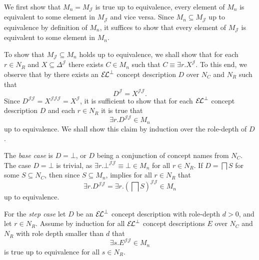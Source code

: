 \begin{Proof}
  We first show that $M_{n} = M_{\mathcal{J}}$ is true up to equivalence, \ie every
  element of $M_{n}$ is equivalent to some element in $M_{\mathcal{J}}$ and vice versa.
  Since $M_{n} \subseteq M_{\mathcal{J}}$ up to equivalence by definition of $M_{n}$, it
  suffices to show that every element of $M_{\mathcal{J}}$ is equivalent to some element
  in $M_{n}$.

  To show that $M_{\mathcal{J}} \subseteq M_{n}$ holds up to equivalence, we shall show
  that for each $r \in N_{R}$ and $X \subseteq \Delta^{\mathcal{J}}$ there exists $C \in
  M_{n}$ such that $C \equiv \exists r. X^{\mathcal{J}}$.  To this end, we observe that by
   there exists an ${{\mathcal{E}\kern-.3ex\mathcal{L}}^\bot}$ concept description $D$ over $N_{C}$ and
  $N_{R}$ such that
  \begin{equation*}
    D^{\mathcal{J}} = X^{\mathcal{J}\mathcal{J}}.
  \end{equation*}
  Since $D^{\mathcal{J}\mathcal{J}} = X^{\mathcal{J}\mathcal{J}\mathcal{J}} =
  X^{\mathcal{J}}$, it is sufficient to show that for each ${{\mathcal{E}\kern-.3ex\mathcal{L}}^\bot}$ concept description
  $D$ and each $r \in N_{R}$ it is true that
  \begin{equation*}
    \exists r. D^{\mathcal{J}\mathcal{J}} \in M_{n}
  \end{equation*}
  up to equivalence.  We shall show this claim by induction over the role-depth of $D$.

  The \textit{base case} is $D = \bot$, or $D$ being a conjunction of concept names from
  $N_{C}$.  The case $D = \bot$ is trivial, as $\exists r. \bot^{\mathcal{J}\mathcal{J}}
  \equiv \bot \in M_{n}$ for all $r \in N_{R}$.  If $D = \bigsqcap S$ for some $S
  \subseteq N_{C}$, then since $S \subseteq M_{n}$,  implies
  for all $r \in N_{R}$ that
  \begin{equation*}
    \exists r. D^{\mathcal{J}\mathcal{J}} = \exists r. (\bigsqcap
    S)^{\mathcal{J}\mathcal{J}} \in M_{n}
  \end{equation*}
  up to equivalence.

  For the \textit{step case} let $D$ be an ${{\mathcal{E}\kern-.3ex\mathcal{L}}^\bot}$ concept description with role-depth $d
  > 0$, and let $r \in N_{R}$.  Assume by induction for all ${{\mathcal{E}\kern-.3ex\mathcal{L}}^\bot}$ concept descriptions
  $E$ over $N_{C}$ and $N_{R}$ with role depth smaller than $d$ that
  \begin{equation}
    \label{eq:55}
    \exists s. E^{\mathcal{J}\mathcal{J}} \in M_{n}
  \end{equation}
  is true up to equivalence for all $s \in N_{R}$.


\end{Proof}
